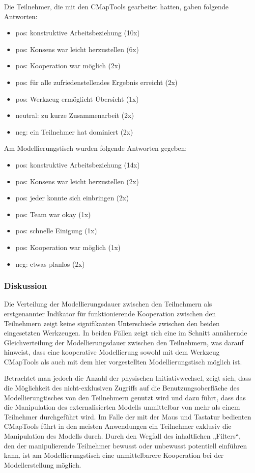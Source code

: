 Die Teilnehmer, die mit den CMapTools gearbeitet hatten, gaben folgende Antworten:
\begin{itemize}
	\item pos: konstruktive Arbeitsbeziehung (10x)
	\item pos: Konsens war leicht herzustellen (6x)
	\item pos: Kooperation war möglich (2x)
	\item pos: für alle zufriedenstellendes Ergebnis erreicht (2x)
	\item pos: Werkzeug ermöglicht Übersicht (1x)
	\item neutral: zu kurze Zusammenarbeit (2x)
	\item neg: ein Teilnehmer hat dominiert (2x)
\end{itemize}

Am Modellierungstisch wurden folgende Antworten gegeben:
\begin{itemize}
	\item pos: konstruktive Arbeitsbeziehung (14x) 
	\item pos: Konsens war leicht herzustellen (2x)
	\item pos: jeder konnte sich einbringen (2x) 
	\item pos: Team war okay (1x) 
	\item pos: schnelle Einigung (1x)
	\item pos: Kooperation war möglich (1x)
	\item neg: etwas planlos (2x)
\end{itemize}

\subsubsection{Diskussion} %

Die Verteilung der Modellierungsdauer zwischen den Teilnehmern als erstgenannter Indikator für funktionierende Kooperation zwischen den Teilnehmern zeigt keine signifikanten Unterschiede zwischen den beiden eingesetzten Werkzeugen. In beiden Fällen zeigt sich eine im Schnitt annähernde Gleichverteilung der Modellierungsdauer zwischen den Teilnehmern, was darauf hinweist, dass eine kooperative Modellierung sowohl mit dem Werkzeug CMapTools als auch mit dem hier vorgestellten Modellierungstisch möglich ist.

Betrachtet man jedoch die Anzahl der physischen Initiativwechsel, zeigt sich, dass die Möglichkeit des nicht-exklusiven Zugriffs auf die Benutzungsoberfläche des Modellierungtisches von den Teilnehmern genutzt wird und dazu führt, dass das die Manipulation des externalisierten Modells unmittelbar von mehr als einem Teilnehmer durchgeführt wird. Im Falle der mit der Maus und Tastatur bedienten CMapTools führt in den meisten Anwendungen ein Teilnehmer exklusiv die Manipulation des Modells durch. Durch den Wegfall des inhaltlichen „Filters“, den der manipulierende Teilnehmer bewusst oder unbewusst potentiell einführen kann, ist am Modellierungstisch eine unmittelbarere Kooperation bei der Modellerstellung möglich.

